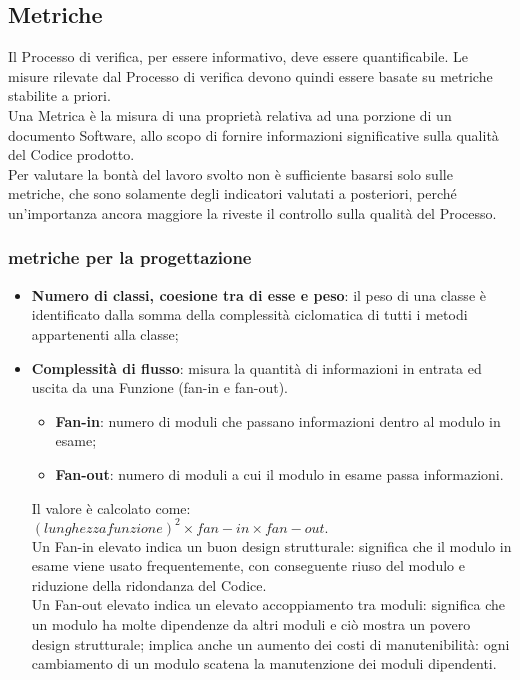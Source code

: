 \subsection{Metriche}{
	\label{sec:metriche}
	Il Processo di verifica, per essere informativo, deve essere quantificabile. Le misure rilevate dal Processo di verifica devono quindi essere basate su metriche stabilite a priori. \\
	Una Metrica è la misura di una proprietà relativa ad una porzione di un documento Software, allo scopo di fornire informazioni significative sulla qualità del Codice prodotto. \\
	Per valutare la bontà del lavoro svolto non è sufficiente basarsi solo sulle metriche, che sono solamente degli indicatori valutati a posteriori, perché un'importanza ancora maggiore la riveste il controllo sulla qualità del Processo.
\subsubsection{metriche per la progettazione}{
	\begin{itemize}
		\item \textbf{Numero di classi, coesione tra di esse e peso}: il peso di una classe è identificato dalla somma della complessità ciclomatica di tutti i metodi appartenenti alla classe;
	 	\item \textbf{Complessità di flusso}: misura la quantità di informazioni in	entrata ed uscita da una Funzione (fan-in e fan-out).\\
	 	\begin{itemize}
	 	 \item \textbf{Fan-in}: numero di moduli che passano informazioni dentro al modulo in esame;
	 	 \item \textbf{Fan-out}: numero di moduli a cui il modulo in esame passa informazioni.
	 	\end{itemize}
	 	Il valore è calcolato come:\\
	 	$(lunghezzafunzione)^2\times fan-in \times fan-out.$\\
	 	Un Fan-in elevato indica un buon design strutturale: significa che il modulo in esame viene usato frequentemente, con conseguente riuso del modulo e riduzione della ridondanza del Codice.\\
	 	Un Fan-out elevato indica un elevato accoppiamento tra moduli: significa che un modulo ha molte dipendenze da altri moduli e ciò mostra un povero design strutturale;
	 	implica anche un aumento dei costi di manutenibilità: ogni cambiamento di un modulo scatena la manutenzione dei moduli dipendenti.
	\end{itemize}
	}
}
